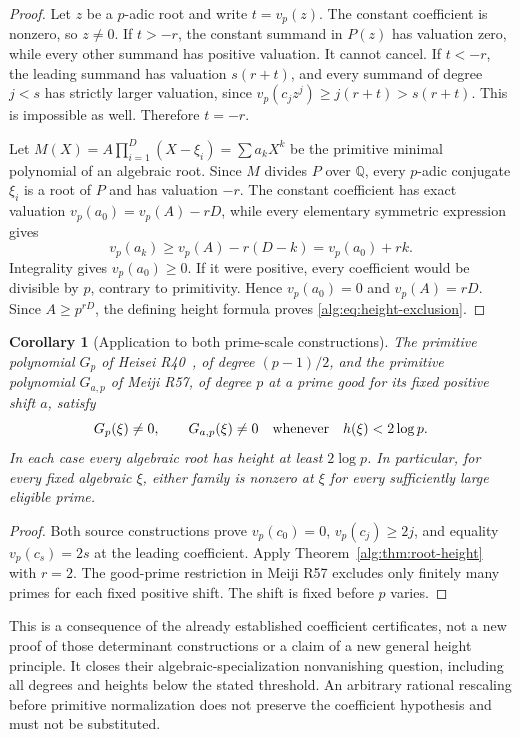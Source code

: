 \documentclass[11pt,a4paper]{article}
\numberwithin{equation}{section}
\newtheorem{corollary}[theorem]{Corollary}
\theoremstyle{definition}\newtheorem{definition}[theorem]{Definition}
\theoremstyle{remark}\newtheorem{remark}[theorem]{Remark}
\begin{document}
\begin{proof}
Let $z$ be a $p$-adic root and write $t=v_p(z)$. The constant coefficient
is nonzero, so $z\ne0$. If $t>-r$, the constant summand in $P(z)$ has
valuation zero, while every other summand has positive valuation. It cannot
cancel. If $t<-r$, the leading summand has valuation $s(r+t)$, and every
summand of degree $j<s$ has strictly larger valuation, since
$v_p(c_jz^j)\ge j(r+t)>s(r+t)$. This is impossible as well. Therefore $t=-r$.

Let $M(X)=A\prod_{i=1}^D(X-\xi_i)=\sum a_kX^k$ be the primitive minimal
polynomial of an algebraic root. Since $M$ divides $P$ over $\mathbb Q$,
every $p$-adic conjugate $\xi_i$ is a root of $P$ and has valuation $-r$.
The constant coefficient has exact valuation
$v_p(a_0)=v_p(A)-rD$, while every elementary symmetric expression gives
\[
 v_p(a_k)\ge v_p(A)-r(D-k)=v_p(a_0)+rk.
\]
Integrality gives $v_p(a_0)\ge0$. If it were positive, every coefficient
would be divisible by $p$, contrary to primitivity. Hence $v_p(a_0)=0$
and $v_p(A)=rD$. Since $A\ge p^{rD}$, the defining height formula proves
\eqref{alg:eq:height-exclusion}.
\end{proof}

\begin{corollary}[Application to both prime-scale constructions]
\label{alg:cor:determinant-root-height}
The primitive polynomial $G_p$ of Heisei R40~\cite{H40}, of degree $(p-1)/2$, and
the primitive polynomial $G_{a,p}$ of Meiji R57, of degree $p$ at a prime
good for its fixed positive shift $a$, satisfy
\[
 G_p(\xi)\ne0,\qquad G_{a,p}(\xi)\ne0
 \quad\hbox{whenever}\quad h(\xi)<2\log p.
\]
In each case every algebraic root has height at least $2\log p$.
In particular, for every fixed algebraic $\xi$, either family is nonzero
at $\xi$ for every sufficiently large eligible prime.
\end{corollary}
\begin{proof}
Both source constructions prove
$v_p(c_0)=0$, $v_p(c_j)\ge2j$, and equality $v_p(c_s)=2s$ at the leading
coefficient. Apply Theorem~\ref{alg:thm:root-height} with $r=2$.
The good-prime restriction in Meiji R57 excludes only finitely many primes
for each fixed positive shift. The shift is fixed before $p$ varies.
\end{proof}

This is a consequence of the already established coefficient certificates,
not a new proof of those determinant constructions or a claim of a new
general height principle. It closes their algebraic-specialization
nonvanishing question, including all degrees and heights below the stated
threshold. An arbitrary rational rescaling before primitive normalization
does not preserve the coefficient hypothesis and must not be substituted.
\end{document}
